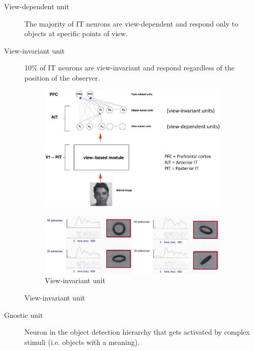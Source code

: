 \begin{description}
    \item[View-dependent unit] 
        The majority of IT neurons are view-dependent and respond only to objects at specific points of view.

    \item[View-invariant unit] 
        10\% of IT neurons are view-invariant and respond regardless of the position of the observer.
\end{description}

\begin{figure}[H]
    \centering
    \begin{subfigure}{0.48\linewidth}
        \centering
        \includegraphics[width=0.95\linewidth]{./img/object_recognition_process.png}
    \end{subfigure}
    \begin{subfigure}{0.48\linewidth}
        \centering
        \includegraphics[width=0.95\linewidth]{./img/it_view_independent_response.png}
        \caption{View-invariant unit}
    \end{subfigure}
\end{figure}


\begin{description}
    \item[Gnostic unit] 
        Neuron in the object detection hierarchy that gets activated by complex stimuli (i.e. objects with a meaning).
\end{description}

